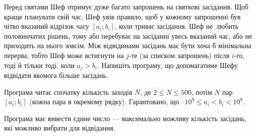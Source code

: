 ﻿Перед святами Шеф отримує дуже багато запрошень на святкові засідання. Щоб краще планувати свій час, Шеф увів правило, щоб у кожному запрошенні був чітко вказаний відрізок часу $[a_i; b_i]$, коли триває засідання. Шеф не~любить половинчатих рішень, тому або перебуває на засіданні увесь вказаний час, або не приходить на нього зовсім. Між відвідинами засідань має бути хоча б мінімальна перерва, тобто Шеф може встигнути на $j$-те (за списком запрошень) після $i$-го, тоді й тільки тоді, коли $a_j > b_i$. Напишіть програму, що допомагатиме Шефу відвідати якомога більше засідань.

\InputFile
Програма читає спочатку кількість заходів $N$, де $2\leqslant N\leqslant 500$, потім $N$ пар $[a_i; b_i]$ (кожна пара в окремому рядку). Гарантовано, що $–10^9\leqslant a_i < b_i < 10^9$.

\OutputFile
Програма має вивести єдине число --- максимально можливу кількість засідань, які можливо вибрати для відвідання.

\Examples
\begin{example}
\end{example}